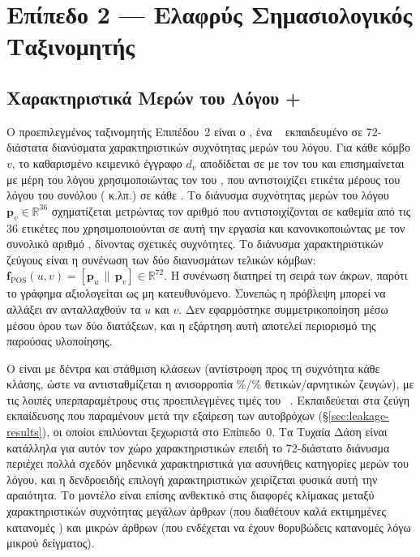 \section{Επίπεδο 2 --- Ελαφρύς Σημασιολογικός Ταξινομητής}
\label{sec:tier2}

\subsection{Χαρακτηριστικά Μερών του Λόγου + }
\label{subsec:pos-features}

Ο προεπιλεγμένος ταξινομητής Επιπέδου~2 είναι ο \texttt{}, ένα ~\cite{breiman2001random}
εκπαιδευμένο σε 72-διάστατα διανύσματα χαρακτηριστικών συχνότητας μερών του
λόγου.
Για κάθε κόμβο $v$, το καθαρισμένο κειμενικό έγγραφο $d_v$ αποδίδεται σε
 με τον  \texttt{} του  και επισημαίνεται
με μέρη του λόγου χρησιμοποιώντας τον \texttt{} του
, που αντιστοιχίζει ετικέτα μέρους του λόγου του συνόλου 
( κ.λπ.) σε κάθε .
Το διάνυσμα συχνότητας μερών του
λόγου $\mathbf{p}_v \in \mathbb{R}^{36}$ σχηματίζεται μετρώντας τον αριθμό 
που αντιστοιχίζονται σε καθεμία από τις 36 ετικέτες  που
χρησιμοποιούνται σε αυτή την εργασία και κανονικοποιώντας με τον συνολικό αριθμό
, δίνοντας σχετικές συχνότητες.
Το διάνυσμα χαρακτηριστικών ζεύγους είναι
η συνένωση των δύο διανυσμάτων τελικών κόμβων: $\mathbf{f}_{\text{POS}}(u,
v) = [\mathbf{p}_u \,\|\, \mathbf{p}_v] \in \mathbb{R}^{72}$.
Η συνένωση διατηρεί τη σειρά των άκρων, παρότι το γράφημα αξιολογείται ως μη
κατευθυνόμενο.
Συνεπώς η πρόβλεψη μπορεί να αλλάξει αν ανταλλαχθούν τα $u$ και
$v$.
Δεν εφαρμόστηκε συμμετρικοποίηση μέσω μέσου όρου των δύο διατάξεων, και η
εξάρτηση αυτή αποτελεί περιορισμό της παρούσας υλοποίησης.

Ο  είναι  με \PosNEstimators{} δέντρα και στάθμιση κλάσεων
 (αντίστροφη προς τη συχνότητα κάθε κλάσης, ώστε να αντισταθμίζεται η
ανισορροπία \TrainPosPct\%/\TrainNegPct\% θετικών/αρνητικών ζευγών), με τις λοιπές υπερπαραμέτρους στις
προεπιλεγμένες τιμές του ~\cite{pedregosa2011scikit}.
Εκπαιδεύεται στα \TrainPairsNoSelf{} ζεύγη
εκπαίδευσης που παραμένουν μετά την εξαίρεση των \SelfLoopsTrain{} αυτοβρόχων
(\S\ref{sec:leakage-results}), οι οποίοι επιλύονται ξεχωριστά στο Επίπεδο~0.
Τα
Τυχαία Δάση είναι κατάλληλα
για αυτόν τον χώρο χαρακτηριστικών επειδή το 72-διάστατο διάνυσμα  περιέχει
πολλά σχεδόν μηδενικά χαρακτηριστικά για ασυνήθεις κατηγορίες μερών του λόγου, και
η δενδροειδής επιλογή χαρακτηριστικών χειρίζεται φυσικά αυτή την αραιότητα.
Το
μοντέλο είναι επίσης ανθεκτικό στις διαφορές κλίμακας μεταξύ χαρακτηριστικών
συχνότητας μεγάλων άρθρων (που διαθέτουν καλά εκτιμημένες κατανομές ) και
μικρών άρθρων (που ενδέχεται να έχουν θορυβώδεις κατανομές λόγω μικρού δείγματος).

